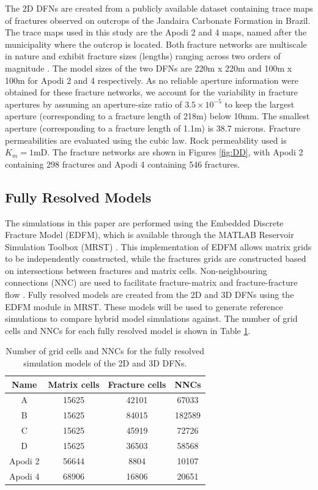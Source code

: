 \documentclass[draft]{agujournal2018}
\begin{document}
The 2D DFNs are created from a publicly available dataset containing trace maps of fractures observed on outcrops of the Jandaira Carbonate Formation in Brazil. The trace maps used in this study are the Apodi 2 and 4 maps, named after the municipality where the outcrop is located. Both fracture networks are multiscale in nature and exhibit fracture sizes (lengths) ranging across two orders of magnitude \citep{Bisdom2015}. The model sizes of the two DFNs are 220m x 220m and 100m x 100m for Apodi 2 and 4 respectively. As no reliable aperture information were obtained for these fracture networks, we account for the variability in fracture apertures by assuming an aperture-size ratio of $3.5\times 10^{-5}$ to keep the largest aperture (corresponding to a fracture length of 218m) below 10mm. The smallest aperture (corresponding to a fracture length of 1.1m) is 38.7 microns. Fracture permeabilities are evaluated using the cubic law. Rock permeability used is $K_m=1$mD. The fracture networks are shown in Figures \ref{fig:DD}, with Apodi 2 containing 298 fractures and Apodi 4 containing 546 fractures.

\subsection{Fully Resolved Models}
The simulations in this paper are performed using the Embedded Discrete Fracture Model (EDFM), which is available through the MATLAB Reservoir Simulation Toolbox (MRST) \citep{Lie2012, Shah2016}. This implementation of EDFM allows matrix grids to be independently constructed, while the fractures grids are constructed based on intersections between fractures and matrix cells. Non-neighbouring connections (NNC) are used to facilitate fracture-matrix and fracture-fracture flow \citep{Lee2001, Li2008, Moinfar2014}. Fully resolved models are created from the 2D and 3D DFNs using the EDFM module in MRST. These models will be used to generate reference simulations to compare hybrid model simulations against. The number of grid cells and NNCs for each fully resolved model is shown in Table \ref{tab:gridstats}.

\begin{table}[htb]
	\centering
	\begin{tabular}{| c | c | c | c |}
		\hline
		Name & Matrix cells & Fracture cells & NNCs\\
		\hline
		A & 15625 & 42101 & 67033\\
		B & 15625 & 84015 & 182589\\
		C & 15625 & 45919 & 72726\\
		D & 15625 & 36503 & 58568\\
		Apodi 2 & 56644 & 8804 & 10107\\
		Apodi 4 & 68906 & 16806 & 20651\\
		\hline
	\end{tabular}
\caption{Number of grid cells and NNCs for the fully resolved simulation models of the 2D and 3D DFNs.}
\label{tab:gridstats}
\end{table}
\end{document}

